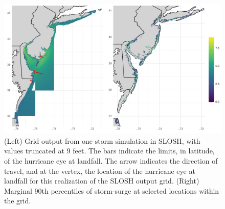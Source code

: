 \begin{figure}[t!]
    \centering
    \includegraphics[width = 0.8\linewidth]{./plots/slosh_combined}
    \caption{(Left) Grid output from one storm simulation in SLOSH, with values 
    truncated at 9 feet.  The bars indicate the limits, in latitude, of the hurricane
    eye at landfall.  The arrow indicates the direction of travel, and at the vertex, 
    the location of the hurricane eye at landfall for this realization of the SLOSH 
    output grid.  (Right) Marginal 90th percentiles of storm-surge at selected
    locations within the grid.\label{figf:sloshexplore}}
\end{figure}

